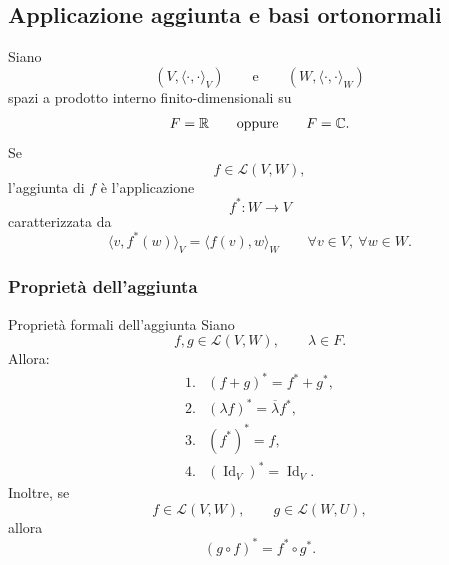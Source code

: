 \documentclass[a4paper]{article}
\begin{document}
\subsection{Applicazione aggiunta e basi ortonormali}

Siano
\[
    (V,\langle\cdot,\cdot\rangle_V)
    \qquad
    \text{e}
    \qquad
    (W,\langle\cdot,\cdot\rangle_W)
\]
spazi a prodotto interno finito-dimensionali su
\[
    F=\mathbb{R}
    \qquad
    \text{oppure}
    \qquad
    F=\mathbb{C}.
\]
Se
\[
    f\in\mathcal{L}(V,W),
\]
l'aggiunta di \(f\) è l'applicazione
\[
    f^*:W\to V
\]
caratterizzata da
\[
    \langle v,f^*(w)\rangle_V
    =
    \langle f(v),w\rangle_W
    \qquad
    \forall v\in V,\ \forall w\in W.
\]

\subsubsection{Proprietà dell'aggiunta}

\begin{snippetproposition}{Proprietà formali dell'aggiunta}
    Siano
    \[
        f,g\in\mathcal{L}(V,W),
        \qquad
        \lambda\in F.
    \]
    Allora:
    \[
        \begin{array}{ll}
            \text{1.} & (f+g)^*=f^*+g^*,\\[1mm]
            \text{2.} & (\lambda f)^*=\overline{\lambda}f^*,\\[1mm]
            \text{3.} & (f^*)^*=f,\\[1mm]
            \text{4.} & (\operatorname{Id}_V)^*=\operatorname{Id}_V.
        \end{array}
    \]
    Inoltre, se
    \[
        f\in\mathcal{L}(V,W),
        \qquad
        g\in\mathcal{L}(W,U),
    \]
    allora
    \[
        (g\circ f)^*=f^*\circ g^*.
    \]
\end{snippetproposition}
\end{document}
